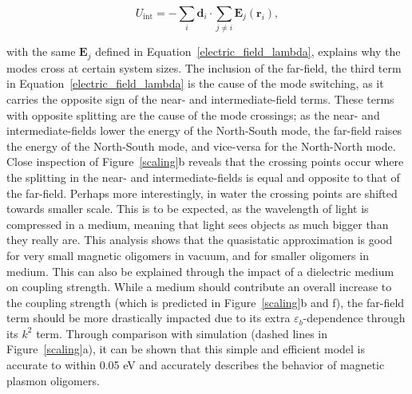 \documentclass[journal=apchd5,manuscript=article]{achemso}
\begin{document}
\begin{equation}
U_{\textrm{int}} = -\sum_i \textbf{d}_i \cdot \sum_{j \neq i} \textbf{E}_j(\textbf{r}_i),
\label{interactionenergy}
\end{equation}

\noindent with the same $\textbf{E}_j$ defined in Equation~\ref{electric_field_lambda}, explains why the modes cross at certain system sizes. The inclusion of the far-field, the third term in Equation~\ref{electric_field_lambda} is the cause of the mode switching, as it carries the opposite sign of the near- and intermediate-field terms. These terms with opposite splitting are the cause of the mode crossings; as the near- and intermediate-fields lower the energy of the North-South mode, the far-field raises the energy of the North-South mode, and vice-versa for the North-North mode. Close inspection of Figure~\ref{scaling}b reveals that the crossing points occur where the splitting in the near- and intermediate-fields is equal and opposite to that of the far-field. Perhaps more interestingly, in water the crossing points are shifted towards smaller scale. This is to be expected, as the wavelength of light is compressed in a medium, meaning that light sees objects as much bigger than they really are. This analysis shows that the quasistatic approximation is good for very small magnetic oligomers in vacuum, and for smaller oligomers in medium. This can also be explained through the impact of a dielectric medium on coupling strength. While a medium should contribute an overall increase to the coupling strength (which is predicted in Figure~\ref{scaling}b and f), the far-field term should be more drastically impacted due to its extra $\varepsilon_b$-dependence through its $k^2$ term.\cite{Elsayed2008} Through comparison with simulation (dashed lines in Figure~\ref{scaling}a), it can be shown that this simple and efficient model is accurate to within 0.05 eV and accurately describes the behavior of magnetic plasmon oligomers.
\end{document}

